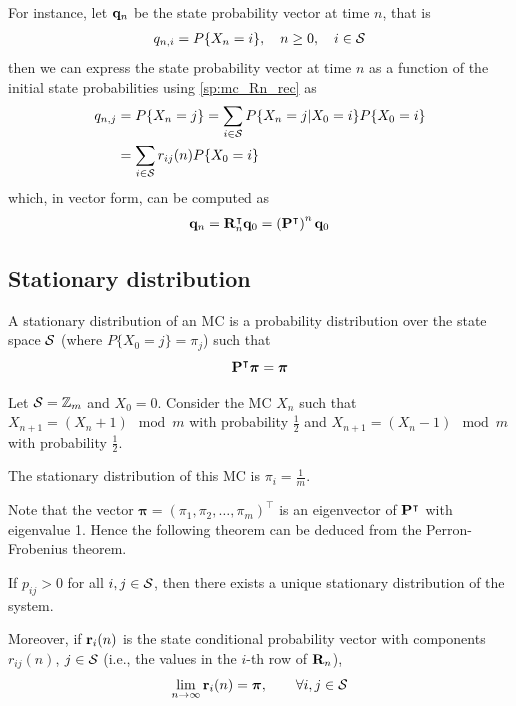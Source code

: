 For instance, let ${\bf q}_n$ be the state probability vector at time $n$, that is
\begin{align}
q_{n,i} = P\{X_n = i\},    \quad n \ge 0, \quad {i \in {\cal S}}
\end{align}
then we can express the state probability vector at time $n$ as a function of the initial state probabilities using \eqref{sp:mc_Rn_rec} as
\begin{align}
q_{n,j} &= P\{X_n = j\} 
         = \sum_{i \in {\cal S}} P\{X_n = j | X_0 = i\} P\{X_0 = i\} \nonumber\\
        &= \sum_{i \in {\cal S}}  r_{ij}(n) P\{X_0 = i\}
\end{align}
which, in vector form, can be computed as
\begin{align}
{\bf q}_n = {\bf R}_n^\intercal {\bf q}_0 = \left({\bf P}^\intercal\right)^n {\bf q}_0
\end{align}

\subsection{Stationary distribution}

\begin{definition}
A stationary distribution of an MC is a probability distribution over the state space ${\cal S}$ (where $P\{X_0=j\} = \pi_j$) such that
\begin{equation}
\label{sp:mc_stat_def}
{\bf P}^\intercal \bm{\pi} = \bm{\pi}
\end{equation}

\end{definition}

\begin{example}
Let ${\cal S} = \mathbb{Z}_m$ and $X_0=0$. Consider the MC $X_n$ such that $X_{n+1}=(X_n+1) \mod m$ with probability $\frac12$ and $X_{n+1} = (X_n-1) \mod  m$ with probability $\frac12$.

The stationary distribution of this MC is $\pi_i = \frac1m$.
\end{example}

Note that the vector $\bm{\pi} = (\pi_1, \pi_2, \ldots , \pi_m)^\intercal$ is an eigenvector of ${\bf P}^\intercal$ with eigenvalue 1. Hence the following theorem can be deduced from the Perron-Frobenius theorem.

\begin{theorem}
If $p_{ij} > 0$ for all $i, j \in {\cal S}$, then there exists a unique stationary distribution of the system. 

Moreover, if ${\bf r}_i(n)$ is the state conditional probability vector with components $r_{ij}(n)$, $j \in {\cal S}$ (i.e., the values in the $i$-th row of ${\bf R}_n$),
\begin{align}
\lim_{n \rightarrow \infty} {\bf r}_i(n) = \bm{\pi}, \qquad \forall i, j \in {\cal S}
\end{align}
\end{theorem}

